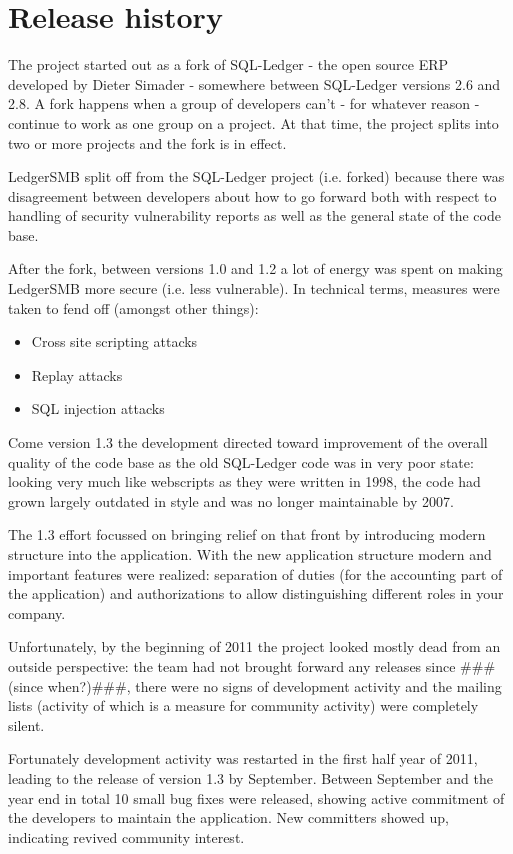 \section{Release history}

The project started out as a fork of SQL-Ledger - the open source ERP
developed by Dieter Simader - somewhere between SQL-Ledger versions 2.6
and 2.8.  A fork happens when a group of developers can't - for whatever
reason - continue to work as one group on a project.  At that time, the
project splits into two or more projects and the fork is in effect.

LedgerSMB split off from the SQL-Ledger project (i.e. forked) because
there was disagreement between developers about how to go forward both with
respect to handling of security vulnerability reports as well as the general
state of the code base.

After the fork, between versions 1.0 and 1.2 a lot of energy was spent on
making LedgerSMB more secure (i.e. less vulnerable).  In technical terms,
measures were taken to fend off (amongst other things):

\begin{itemize}
\item Cross site scripting attacks
\item Replay attacks
\item SQL injection attacks
\end{itemize}

Come version 1.3 the development directed toward improvement of the overall
quality of the code base as the old SQL-Ledger code was in very poor state:
looking very much like webscripts as they were written in 1998, the code had
grown largely outdated in style and was no longer maintainable by 2007.

The 1.3 effort focussed on bringing relief on that front by introducing
modern structure into the application.  With the new application structure
modern and important features were realized: separation of duties (for the
accounting part of the application) and authorizations to allow distinguishing
different roles in your company.

Unfortunately, by the beginning of 2011 the project looked mostly dead from
an outside perspective: the team had not brought forward any releases since
\#\#\#(since when?)\#\#\#, there were no signs of development activity and the
mailing lists (activity of which is a measure for community activity) were
completely silent.

Fortunately development activity was restarted in the first half year of 2011,
leading to the release of version 1.3 by September.  Between September and the
year end in total 10 small bug fixes were released, showing active commitment
of the developers to maintain the application.  New committers showed up, indicating
revived community interest.



